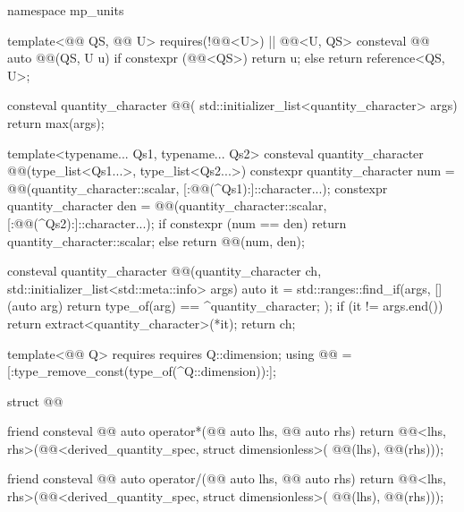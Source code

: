 \begin{codeblock}
namespace mp_units {

template<@@ QS, @@ U>
  requires(!@@<U>) || @@<U, QS{}>
consteval @@ auto @@(QS, U u)
{
  if constexpr (@@<QS>)
    return u;
  else
    return reference<QS, U>{};
}

consteval quantity_character @@(
  std::initializer_list<quantity_character> args)
{
  return max(args);
}

template<typename... Qs1, typename... Qs2>
consteval quantity_character @@(type_list<Qs1...>, type_list<Qs2...>)
{
  constexpr quantity_character num =
    @@({quantity_character::scalar, [:@@(^Qs1):]::character...});
  constexpr quantity_character den =
    @@({quantity_character::scalar, [:@@(^Qs2):]::character...});
  if constexpr (num == den)
    return quantity_character::scalar;
  else
    return @@({num, den});
}

consteval quantity_character @@(quantity_character ch,
                                                     std::initializer_list<std::meta::info> args)
{
  auto it =
    std::ranges::find_if(args, [](auto arg) { return type_of(arg) == ^quantity_character; });
  if (it != args.end()) return extract<quantity_character>(*it);
  return ch;
}

template<@@ Q>
  requires requires { Q::dimension; }
using @@ = [:type_remove_const(type_of(^Q::dimension)):];

struct @@ {
  friend consteval @@ auto operator*(@@ auto lhs, @@ auto rhs)
  {
    return @@<lhs, rhs>(@@<derived_quantity_spec, struct dimensionless>(
      @@(lhs), @@(rhs)));
  }

  friend consteval @@ auto operator/(@@ auto lhs, @@ auto rhs)
  {
    return @@<lhs, rhs>(@@<derived_quantity_spec, struct dimensionless>(
      @@(lhs), @@(rhs)));
  }

}}
\end{codeblock}
